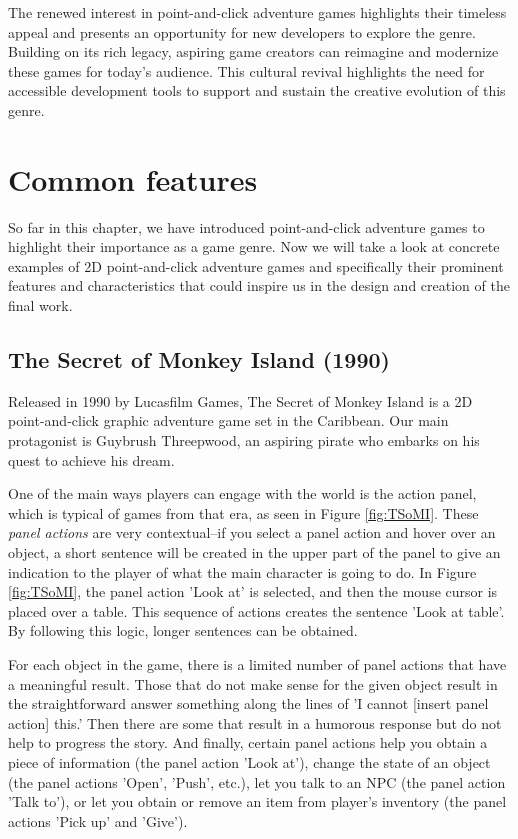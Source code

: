 The renewed interest in point-and-click adventure games highlights their timeless appeal and presents an opportunity for new developers to explore the genre. Building on its rich legacy, aspiring game creators can reimagine and modernize these games for today's audience. This cultural revival highlights the need for accessible development tools to support and sustain the creative evolution of this genre.

\section{Common features}
So far in this chapter, we have introduced point-and-click adventure games to highlight their importance as a game genre. Now we will take a look at concrete examples of 2D point-and-click adventure games and specifically their prominent features and characteristics that could inspire us in the design and creation of the final work.

\subsection{The Secret of Monkey Island (1990)}
Released in 1990 by Lucasfilm Games, The Secret of Monkey Island is a 2D point-and-click graphic adventure game set in the Caribbean. Our main protagonist is Guybrush Threepwood, an aspiring pirate who embarks on his quest to achieve his dream.

One of the main ways players can engage with the world is the action panel, which is typical of games from that era, as seen in Figure \ref{fig:TSoMI}. These \textit{panel actions} are very contextual--if you select a panel action and hover over an object, a short sentence will be created in the upper part of the panel to give an indication to the player of what the main character is going to do. In Figure \ref{fig:TSoMI}, the panel action 'Look at' is selected, and then the mouse cursor is placed over a table. This sequence of actions creates the sentence 'Look at table'. By following this logic, longer sentences can be obtained.

For each object in the game, there is a limited number of panel actions that have a meaningful result. Those that do not make sense for the given object result in the straightforward answer something along the lines of 'I cannot [insert panel action] this.' Then there are some that result in a humorous response but do not help to progress the story. And finally, certain panel actions help you obtain a piece of information (the panel action 'Look at'), change the state of an object (the panel actions 'Open', 'Push', etc.), let you talk to an NPC (the panel action 'Talk to'), or let you obtain or remove an item from player's inventory (the panel actions 'Pick up' and 'Give').

